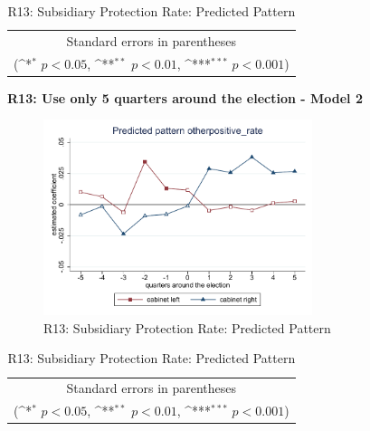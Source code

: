 \documentclass[10pt,a4paper]{scrartcl}
\begin{document}
\begin{table}[!ht]\centering
	\renewcommand{\arraystretch}{1.25}
	\def\sym#1{\ifmmode^{#1}\else\(^{#1}\)\fi}
	\caption{R13: Subsidiary Protection Rate: Predicted Pattern}
	\begin{tabular}{l*{2}{c}}
		\hline\hline
		
		\hline\hline
		\multicolumn{3}{c}{\footnotesize Standard errors in parentheses} \\
		\multicolumn{3}{c}{\footnotesize (\sym{*} \(p<0.05\), \sym{**} \(p<0.01\), \sym{***} \(p<0.001\))}\\
	\end{tabular}
\end{table}

\clearpage
\textbf{R13: Use only 5 quarters around the election - Model 2}
\begin{figure}[!ht]
	\centering
	\includegraphics[width=0.7\textwidth]{figures_edited/otherpositive_rate_graph2_R13.pdf}
	\caption{R13: Subsidiary Protection Rate: Predicted Pattern}
\end{figure}

\begin{table}[!ht]\centering
	\footnotesize
	\renewcommand{\arraystretch}{1.2}
	\def\sym#1{\ifmmode^{#1}\else\(^{#1}\)\fi}
	\caption{R13: Subsidiary Protection Rate: Predicted Pattern}
	\begin{tabular}{l*{2}{c}}
		\hline\hline
		
		\hline\hline
		\multicolumn{3}{c}{\footnotesize Standard errors in parentheses} \\
		\multicolumn{3}{c}{\footnotesize (\sym{*} \(p<0.05\), \sym{**} \(p<0.01\), \sym{***} \(p<0.001\))} \\
	\end{tabular}
\end{table}
\end{document}

